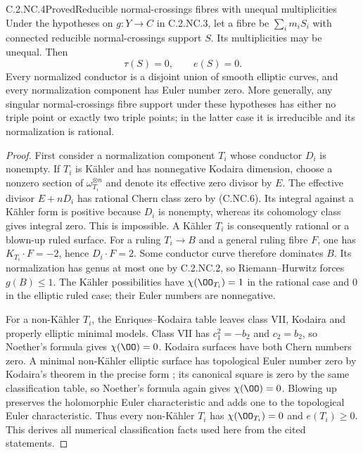 \begin{statement}{C.2.NC.4}{Proved}{Reducible normal-crossings fibres with unequal multiplicities}
Under the hypotheses on $g:Y\to C$ in C.2.NC.3, let a fibre be $\sum_i m_iS_i$ with connected reducible normal-crossings support $S$. Its multiplicities may be unequal. Then
\[
 \tau(S)=0,\qquad e(S)=0.
 \tag{C.NC.9}
\]
Every normalized conductor is a disjoint union of smooth elliptic curves, and every normalization component has Euler number zero. More generally, any singular normal-crossings fibre support under these hypotheses has either no triple point or exactly two triple points; in the latter case it is irreducible and its normalization is rational.
\end{statement}
\begin{proof}
First consider a normalization component $T_i$ whose conductor $D_i$ is nonempty. If $T_i$ is Kähler and has nonnegative Kodaira dimension, choose a nonzero section of $\omega_{T_i}^{\otimes n}$ and denote its effective zero divisor by $E$. The effective divisor $E+nD_i$ has rational Chern class zero by (C.NC.6). Its integral against a Kähler form is positive because $D_i$ is nonempty, whereas its cohomology class gives integral zero. This is impossible. A Kähler $T_i$ is consequently rational or a blown-up ruled surface. For a ruling $T_i\to B$ and a general ruling fibre $F$, one has $K_{T_i}\cdot F=-2$, hence $D_i\cdot F=2$. Some conductor curve therefore dominates $B$. Its normalization has genus at most one by C.2.NC.2, so Riemann--Hurwitz forces $g(B)\le1$. The Kähler possibilities have
$\chi(\OO_{T_i})=1$ in the rational case and $0$ in the elliptic ruled case; their Euler numbers are nonnegative.

For a non-Kähler $T_i$, the Enriques--Kodaira table \cite[Theorem~2.2]{Peters2021} leaves class VII, Kodaira and properly elliptic minimal models. Class VII has $c_1^2=-b_2$ and $c_2=b_2$, so Noether's formula gives $\chi(\OO)=0$. Kodaira surfaces have both Chern numbers zero. A minimal non-Kähler elliptic surface has topological Euler number zero by Kodaira's theorem in the precise form \cite[Theorem~3.2]{BMS2012}; its canonical square is zero by the same classification table, so Noether's formula again gives $\chi(\OO)=0$. Blowing up preserves the holomorphic Euler characteristic and adds one to the topological Euler characteristic. Thus every non-Kähler $T_i$ has $\chi(\OO_{T_i})=0$ and $e(T_i)\ge0$. This derives all numerical classification facts used here from the cited statements.


\end{proof}
